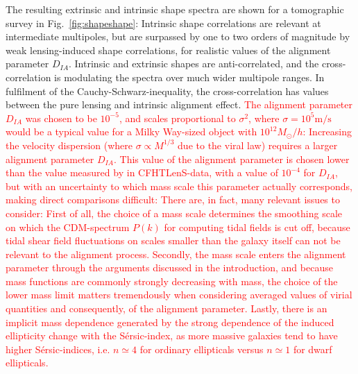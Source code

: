 \documentclass[a4paper,fleqn,usenatbib]{mnras}
\newcommand\spirou[1]{\textcolor{red}{#1}}
\begin{document}
The resulting extrinsic and intrinsic shape spectra are shown for a tomographic survey in Fig.~\ref{fig:shapeshape}: Intrinsic shape correlations are relevant at intermediate multipoles, but are surpassed by one to two orders of magnitude by weak lensing-induced shape correlations, for realistic values of the alignment parameter $D_{IA}$. Intrinsic and extrinsic shapes are anti-correlated, and the cross-correlation is modulating the spectra over much wider multipole ranges. In fulfilment of the Cauchy-Schwarz-inequality, the cross-correlation has values between the pure lensing and intrinsic alignment effect. \spirou{The alignment parameter $D_{IA}$ was chosen to be $10^{-5}$, and scales proportional to $\sigma^2$, where $\sigma=10^5\mathrm{m}/\mathrm{s}$ would be a typical value for a Milky Way-sized object with $10^{12} M_\odot/h$: Increasing the velocity dispersion (where $\sigma\propto M^{1/3}$ due to the viral law) requires a larger alignment parameter $D_{IA}$. This value of the alignment parameter is chosen lower than the value measured by \citet{tugendhat_angular_2018} in CFHTLenS-data, with a value of $10^{-4}$ for $D_{IA}$, but with an uncertainty to which mass scale this parameter actually corresponds, making direct comparisons difficult: There are, in fact, many relevant issues to consider: First of all, the choice of a mass scale determines the smoothing scale on which the CDM-spectrum $P(k)$ for computing tidal fields is cut off, because tidal shear field fluctuations on scales smaller than the galaxy itself can not be relevant to the alignment process. Secondly, the mass scale enters the alignment parameter through the arguments discussed in the introduction, and because mass functions are commonly strongly decreasing with mass, the choice of the lower mass limit matters tremendously when considering averaged values of virial quantities and consequently, of the alignment parameter. Lastly, there is an implicit mass dependence generated by the strong dependence of the induced ellipticity change with the S{\'e}rsic-index, as more massive galaxies tend to have higher S{\'e}rsic-indices, i.e. $n\simeq 4$ for ordinary ellipticals versus $n\simeq 1$ for dwarf ellipticals.}
\end{document}
